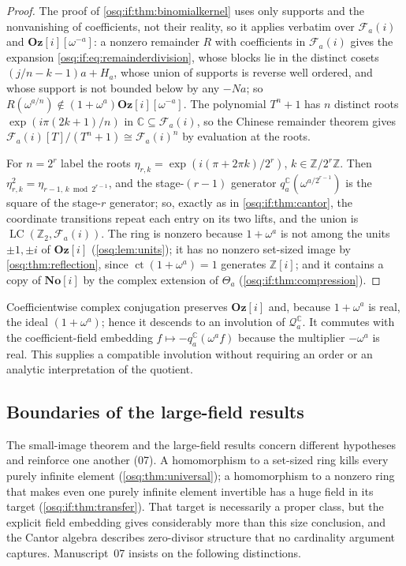 \documentclass[11pt,letterpaper]{article}
\numberwithin{equation}{section}
\theoremstyle{definition}
\theoremstyle{remark}
\theoremstyle{plain}
\newcommand{\No}{\mathbf{No}}
\newcommand{\Oz}{\mathbf{Oz}}
\newcommand{\SC}{\No[i]}
\newcommand{\GOz}{\Oz[i]}
\newcommand{\Z}{\mathbb Z}
\newcommand{\C}{\mathbb C}
\newcommand{\FF}{\mathscr F}         %
\newcommand{\Qa}{\mathcal Q}         %
\newcommand{\ct}{\operatorname{ct}}
\newcommand{\LC}{\operatorname{LC}}
\begin{document}
\begin{proof}
The proof of \cref{osq:if:thm:binomialkernel} uses only supports and the nonvanishing of
coefficients, not their reality, so it applies verbatim over $\FF_a(i)$ and
$\GOz[\omega^{-a}]$: a nonzero remainder $R$ with coefficients in $\FF_a(i)$ gives the
expansion \eqref{osq:if:eq:remainderdivision}, whose blocks lie in the distinct cosets
$(j/n-k-1)a+H_a$, whose union of supports is reverse well ordered, and whose support is
not bounded below by any $-Na$; so $R(\omega^{a/n})\notin(1+\omega^a)\GOz[\omega^{-a}]$.
The polynomial $T^n+1$ has $n$ distinct roots $\exp(i\pi(2k+1)/n)$ in $\C\subseteq\FF_a(i)$,
so the Chinese remainder theorem gives $\FF_a(i)[T]/(T^n+1)\cong\FF_a(i)^n$ by evaluation
at the roots.

For $n=2^r$ label the roots $\eta_{r,k}=\exp(i(\pi+2\pi k)/2^r)$, $k\in\Z/2^r\Z$. Then
$\eta_{r,k}^2=\eta_{r-1,\,k\bmod 2^{r-1}}$, and the stage-$(r-1)$ generator
$q_a^\C(\omega^{a/2^{r-1}})$ is the square of the stage-$r$ generator; so, exactly as in
\cref{osq:if:thm:cantor}, the coordinate transitions repeat each entry on its two lifts,
and the union is $\LC(\Z_2,\FF_a(i))$. The ring is nonzero because $1+\omega^a$ is not
among the units $\pm1,\pm i$ of $\GOz$ (\cref{osq:lem:units}); it has no nonzero set-sized
image by \cref{osq:thm:reflection}, since $\ct(1+\omega^a)=1$ generates $\Z[i]$; and it
contains a copy of $\SC$ by the complex extension of $\Theta_a$
(\cref{osq:if:thm:compression}).
\end{proof}

Coefficientwise complex conjugation preserves $\GOz$ and, because $1+\omega^a$ is real,
the ideal $(1+\omega^a)$; hence it descends to an involution of $\Qa_a^\C$. It commutes
with the coefficient-field embedding $f\mapsto-q_a^\C(\omega^af)$ because the multiplier
$-\omega^a$ is real. This supplies a compatible involution without requiring an order or an
analytic interpretation of the quotient.

\subsection{Boundaries of the large-field results}\label{osq:if:sub:boundaries}

The small-image theorem and the large-field results concern different hypotheses and
reinforce one another (07). A homomorphism to a set-sized ring kills every purely infinite
element (\cref{osq:thm:universal}); a homomorphism to a nonzero ring that makes even one
purely infinite element invertible has a huge field in its target
(\cref{osq:if:thm:transfer}). That target is necessarily a proper class, but the explicit
field embedding gives considerably more than this size conclusion, and the Cantor algebra
describes zero-divisor structure that no cardinality argument captures. Manuscript~07
insists on the following distinctions.
\end{document}
